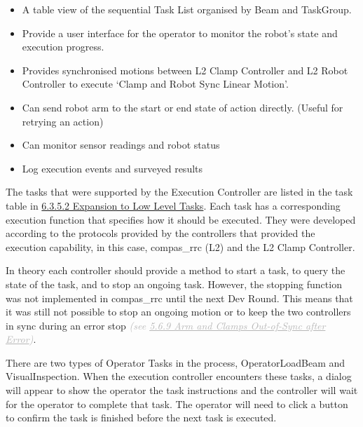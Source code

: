 \begin{itemize}
	\item A table view of the sequential Task List organised by Beam and TaskGroup. 

	\item Provide a user interface for the operator to monitor the robot's state and execution progress.

	\item Provides synchronised motions between L2 Clamp Controller and L2 Robot Controller to execute ‘Clamp and Robot Sync Linear Motion’.

	\item Can send robot arm to the start or end state of action directly. (Useful for retrying an action)

	\item Can monitor sensor readings and robot status

	\item Log execution events and surveyed results

\end{itemize}
The tasks that were supported by the Execution Controller are listed in the task table in \uline{6.3.5.2 Expansion to Low Level Tasks}. Each task has a corresponding execution function that specifies how it should be executed. They were developed according to the protocols provided by the controllers that provided the execution capability, in this case, compas\_rrc (L2) and the L2 Clamp Controller. 

In theory each controller should provide a method to start a task, to query the state of the task, and to stop an ongoing task. However, the stopping function was not implemented in compas\_rrc until the next Dev Round. This means that it was still not possible to stop an ongoing motion or to keep the two controllers in sync during an error stop \textit{\textcolor[HTML]{B7B7B7}{(see \uline{5.6.9 Arm and Clamps Out-of-Sync after Error})}}.


There are two types of Operator Tasks in the process, OperatorLoadBeam and VisualInspection. When the execution controller encounters these tasks, a dialog will appear to show the operator the task instructions and the controller will wait for the operator to complete that task. The operator will need to click a button to confirm the task is finished before the next task is executed. 


